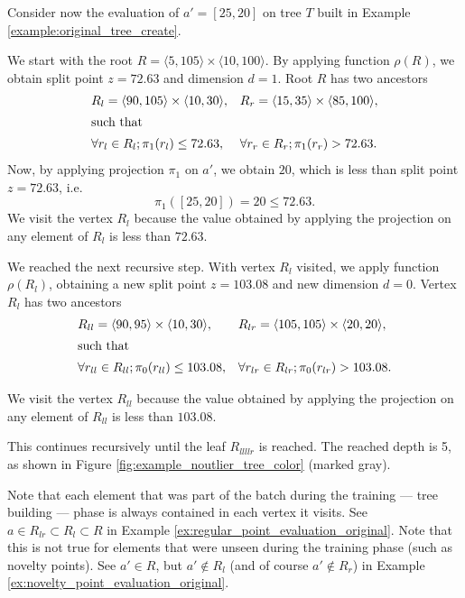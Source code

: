 \begin{example}
\label{ex:novelty_point_evaluation_original}
    Consider now the evaluation of $a' = [25,20]$ on tree $T$ built in Example \ref{example:original_tree_create}.

    We start with the root $R = \langle 5,105\rangle \times \langle 10, 100 \rangle$.
    By applying function $\rho(R)$, we obtain split point $z = 72.63$ and dimension $d = 1$.
    Root $R$ has two ancestors 
\begin{align*}
    &R_l = \langle 90,105\rangle \times \langle 10, 30 \rangle,&
    &R_r = \langle 15,35\rangle \times \langle 85, 100 \rangle,\\
    \intertext{such that}
    &\forall r_l\in R_l; \pi_1(r_l) \le 72.63,&
    &\forall r_r\in R_r; \pi_1(r_r) > 72.63.
\end{align*}
Now, by applying projection $\pi_1$ on $a'$, we obtain $20$, which is less than split point $z = 72.63$, i.e.
$$\pi_1([25,20]) = 20 \le 72.63.$$
We visit the vertex $R_l$ because the value obtained by applying the projection on any element of $R_l$ is less than $72.63$.

We reached the next recursive step. With vertex $R_l$ visited, we apply function $\rho(R_l)$, obtaining a new split point $z = 103.08$ and new dimension $d = 0$.
Vertex $R_l$ has two ancestors 
\begin{align*}
    &R_{ll} = \langle 90,95\rangle \times \langle 10, 30 \rangle,&
    &R_{lr} = \langle 105,105\rangle \times \langle 20,20 \rangle,\\
    \intertext{such that}
    &\forall r_{ll}\in R_{ll}; \pi_0(r_{ll}) \le 103.08,&
    &\forall r_{lr}\in R_{lr}; \pi_0(r_{lr}) > 103.08.
\end{align*}

We visit the vertex $R_{ll}$ because the value obtained by applying the projection on any element of $R_{ll}$ is less than $103.08$.

This continues recursively until the leaf $R_{llllr}$ is reached. The reached depth is 5, as shown in Figure \ref{fig:example_noutlier_tree_color} (marked gray).

\end{example}


Note that each element that was part of the batch during the training --- tree building --- phase is always contained in each vertex it visits.
See $a \in R_{lr} \subset R_{l} \subset R$ in Example \ref{ex:regular_point_evaluation_original}.
Note that this is not true for elements that were unseen during the training phase (such as novelty points).
See $a' \in R$, but $a' \notin R_l$ (and of course $a' \notin R_r$) in Example \ref{ex:novelty_point_evaluation_original}.
